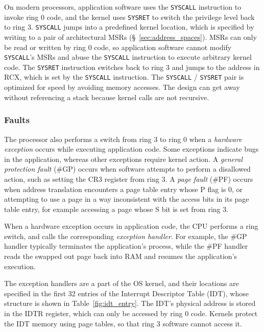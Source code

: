 On modern processors, application software uses the \texttt{SYSCALL}
instruction to invoke ring 0 code, and the kernel uses \texttt{SYSRET} to
switch the privilege level back to ring 3. \texttt{SYSCALL} jumps into a
predefined kernel location, which is specified by writing to a pair of
architectural MSRs (\S~\ref{sec:address_spaces}).  MSRs can only be read or
written by ring 0 code, so application software cannot modify
\texttt{SYSCALL}'s MSRs and abuse the \texttt{SYSCALL} instruction to execute
arbitrary kernel code. The \texttt{SYSRET} instruction switches back to ring 3
and jumps to the address in RCX, which is set by the \texttt{SYSCALL}
instruction. The \texttt{SYSCALL} / \texttt{SYSRET} pair is optimized for speed
by avoiding memory accesses. The design can get away without referencing a
stack because kernel calls are not recursive.


\subsubsection{Faults}
\label{sec:faults}


The processor also performs a switch from ring 3 to ring 0 when a \textit{
hardware exception} occurs while executing application code. Some exceptions
indicate bugs in the application, whereas other exceptions require kernel
action. A \textit{general protection fault} (\#GP) occurs when software
attempts to perform a disallowed action, such as setting the CR3 register from
ring 3. A \textit{page fault} (\#PF) occurs when address translation encounters
a page table entry whose P flag is 0, or attempting to use a page in a way
inconsistent with the access bits in its page table entry, for example
accessing a page whose S bit is set from ring 3.


When a hardware exception occurs in application code, the CPU performs a ring
switch, and calls the corresponding \textit{exception handler}. For example,
the \#GP handler typically terminates the application's process, while the \#PF
handler reads the swapped out page back into RAM and resumes the application's
execution.

The exception handlers are a part of the OS kernel, and their locations are
specified in the first 32 entries of the Interrupt Descriptor Table (IDT),
whose structure is shown in Table~\ref{fig:idt_entry}. The IDT's physical
address is stored in the IDTR register, which can only be accessed by ring 0
code. Kernels protect the IDT memory using page tables, so that ring 3 software
cannot access it.


